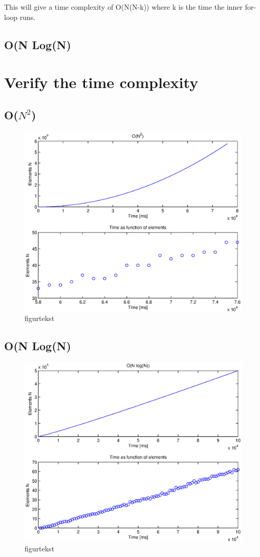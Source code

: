 This will give a time complexity of O(N(N-k)) where k is the time the inner for-loop runs.
\subsection{O(N Log(N)}

\section{Verify the time complexity}

\subsection{O(\(N^{2}\))}
\begin{figure}[th!]
\centering
\includegraphics[width=1\textwidth]{./graphics/test1.eps}
\caption[tekst i indholdsfortegnelsen]{figurtekst}
\label{fig:}
\end{figure}

\subsection{O(N Log(N)}
\begin{figure}[th!]
\centering
\includegraphics[width=1\textwidth]{./graphics/test2.eps}
\caption[tekst i indholdsfortegnelsen]{figurtekst}
\label{fig:}
\end{figure}